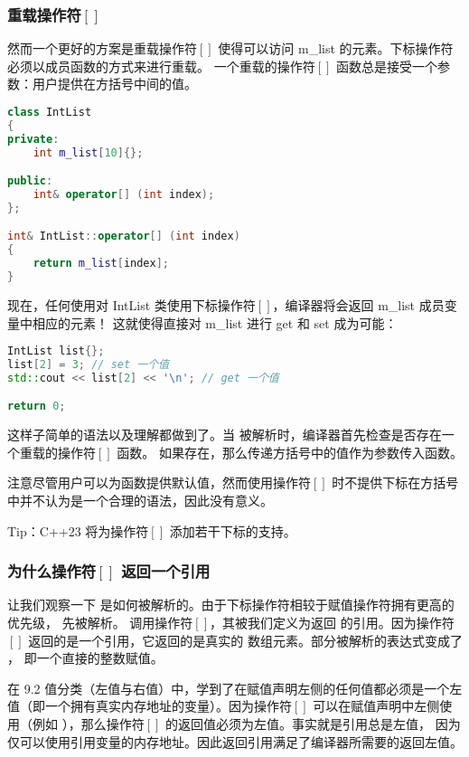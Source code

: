 \documentclass[../../LearnCpp.tex]{subfiles}
\begin{document}
\subsubsection*{重载操作符$\left[\right]$}

然而一个更好的方案是重载操作符$\left[\right]$ 使得可以访问 m\_list 的元素。下标操作符必须以成员函数的方式来进行重载。
一个重载的操作符$\left[\right]$ 函数总是接受一个参数：用户提供在方括号中间的值。

\begin{lstlisting}[language=C++]
class IntList
{
private:
    int m_list[10]{};

public:
    int& operator[] (int index);
};

int& IntList::operator[] (int index)
{
    return m_list[index];
}
\end{lstlisting}

现在，任何使用对 IntList 类使用下标操作符$\left[\right]$，编译器将会返回 m\_list 成员变量中相应的元素！
这就使得直接对 m\_list 进行 get 和 set 成为可能：

\begin{lstlisting}[language=C++]
IntList list{};
list[2] = 3; // set 一个值
std::cout << list[2] << '\n'; // get 一个值

return 0;
\end{lstlisting}

这样子简单的语法以及理解都做到了。当  被解析时，编译器首先检查是否存在一个重载的操作符$\left[\right]$ 函数。
如果存在，那么传递方括号中的值作为参数传入函数。

注意尽管用户可以为函数提供默认值，然而使用操作符$\left[\right]$ 时不提供下标在方括号中并不认为是一个合理的语法，因此没有意义。

Tip：C++23 将为操作符$\left[\right]$ 添加若干下标的支持。

\subsubsection*{为什么操作符$\left[\right]$ 返回一个引用}

让我们观察一下  是如何被解析的。由于下标操作符相较于赋值操作符拥有更高的优先级， 先被解析。
 调用操作符$\left[\right]$，其被我们定义为返回  的引用。因为操作符$\left[\right]$
返回的是一个引用，它返回的是真实的  数组元素。部分被解析的表达式变成了 ，
即一个直接的整数赋值。

在 9.2 值分类（左值与右值）中，学到了在赋值声明左侧的任何值都必须是一个左值（即一个拥有真实内存地址的变量）。因为操作符$\left[\right]$
可以在赋值声明中左侧使用（例如 ），那么操作符$\left[\right]$ 的返回值必须为左值。事实就是引用总是左值，
因为仅可以使用引用变量的内存地址。因此返回引用满足了编译器所需要的返回左值。
\end{document}
